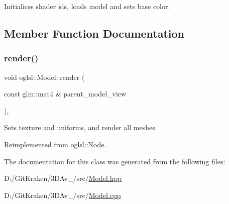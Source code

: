 Initialices shader ids, loads model and sets base color. 



\subsection{Member Function Documentation}
\mbox{\label{classoglsl_1_1_model_a22b769c49add4d10774e90466338c695}} 
\subsubsection{\texorpdfstring{render()}{render()}}
{\footnotesize\ttfamily void oglsl\+::\+Model\+::render (\begin{DoxyParamCaption}\item[{const glm\+::mat4 \&}]{parent\+\_\+model\+\_\+view }\end{DoxyParamCaption})\hspace{0.3cm}{\ttfamily [override]}, {\ttfamily [virtual]}}



Sets texture and uniforms, and render all meshes. 



Reimplemented from \mbox{\hyperlink{classoglsl_1_1_node_a09545b18a2d798327601a6251c091444}{oglsl\+::\+Node}}.



The documentation for this class was generated from the following files\+:\begin{DoxyCompactItemize}
\item 
D\+:/\+Git\+Kraken/3\+D\+Av\+\_/src/\mbox{\hyperlink{_model_8hpp}{Model.\+hpp}}\item 
D\+:/\+Git\+Kraken/3\+D\+Av\+\_/src/\mbox{\hyperlink{_model_8cpp}{Model.\+cpp}}\end{DoxyCompactItemize}
